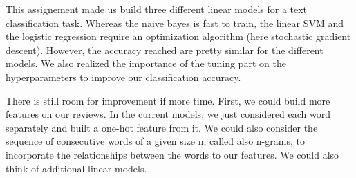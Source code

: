 \documentclass[11pt]{article}
\begin{document}
This assignement made us build three different linear models for a text classification task. Whereas the naive bayes is fast to train, the linear SVM and the logistic regression require an optimization algorithm (here stochastic gradient descent). However, the accuracy reached are pretty similar for the different models. We also realized the importance of the tuning part on the hyperparameters to improve our classification accuracy.

There is still room for improvement if more time. First, we could build more features on our reviews. In the current models, we just considered each word separately and built a one-hot feature from it. We could also consider the sequence of consecutive words of a given size n, called also n-grams, to incorporate the relationships between the words to our features. We could also think of additional linear models.



\end{document}
